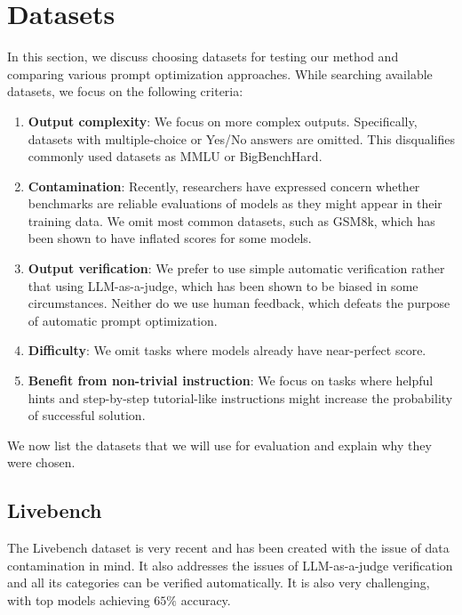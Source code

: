 \section{Datasets}
In this section, we discuss choosing datasets for testing our method and comparing various prompt optimization approaches. 
While searching available datasets, we focus on the following criteria:
\begin{enumerate}
    \item \textbf{Output complexity}: We focus on more complex outputs. Specifically, datasets with multiple-choice or Yes/No answers are omitted. 
    This disqualifies commonly used datasets as MMLU or BigBenchHard.
    \item \textbf{Contamination}: Recently, researchers have expressed concern\cite{white2025livebenchchallengingcontaminationlimitedllm} 
    whether benchmarks are reliable evaluations of models as they might appear in their training data. We omit most common datasets, such as GSM8k\cite{cobbe2021gsm8k}, which has been shown to have inflated scores for some models\cite{testing_language_models_on_a_held_out_high_school_national_finals_exam}.
    \item \textbf{Output verification}: We prefer to use simple automatic verification rather that using LLM-as-a-judge, which has been shown to be 
    biased in some circumstances\cite{ye2024justiceprejudicequantifyingbiases}. Neither do we use human feedback, which defeats the purpose of automatic prompt optimization.
    \item \textbf{Difficulty}: We omit tasks where models already have near-perfect score. 
    \item \textbf{Benefit from non-trivial instruction}: We focus on tasks where helpful hints and step-by-step tutorial-like instructions might increase the probability of successful solution.
\end{enumerate}
We now list the datasets that we will use for evaluation and explain why they were chosen.
\subsection{Livebench}
The Livebench\cite{white2025livebenchchallengingcontaminationlimitedllm} dataset is very recent and has been created with the issue of data contamination in mind.
It also addresses the issues of LLM-as-a-judge verification and all its categories can be verified automatically. It is also very challenging, with top models achieving $65\%$ accuracy\cite{white2025livebenchchallengingcontaminationlimitedllm}.

